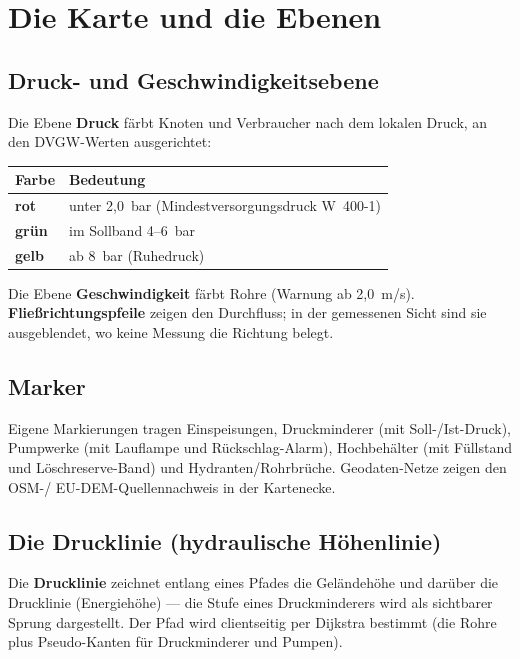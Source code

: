 \documentclass[11pt,a4paper,parskip=half]{scrreprt}
\newcommand{\ui}[1]{\textsf{\bfseries #1}}      %
\begin{document}
\chapter{Die Karte und die Ebenen}
\label{ch:karte}

\section{Druck- und Geschwindigkeitsebene}

Die Ebene \ui{Druck} färbt Knoten und Verbraucher nach dem lokalen Druck, an den
DVGW-Werten ausgerichtet:

\begin{center}
\begin{tabular}{@{}ll@{}}
\toprule
Farbe & Bedeutung \\
\midrule
\textcolor{rot}{\textbf{rot}}   & unter 2{,}0~bar (Mindestversorgungsdruck W~400-1) \\
\textcolor{gruen}{\textbf{grün}} & im Sollband 4--6~bar \\
\textcolor{amber}{\textbf{gelb}} & ab 8~bar (Ruhedruck) \\
\bottomrule
\end{tabular}
\end{center}

Die Ebene \ui{Geschwindigkeit} färbt Rohre (Warnung ab 2{,}0~m/s).
\textbf{Fließrichtungspfeile} zeigen den Durchfluss; in der gemessenen Sicht sind
sie ausgeblendet, wo keine Messung die Richtung belegt.

\section{Marker}
Eigene Markierungen tragen Einspeisungen, Druckminderer (mit Soll-/Ist-Druck),
Pumpwerke (mit Lauflampe und Rückschlag-Alarm), Hochbehälter (mit Füllstand und
Löschreserve-Band) und Hydranten/Rohrbrüche. Geodaten-Netze zeigen den OSM-/
EU-DEM-Quellennachweis in der Kartenecke.

\section{Die Drucklinie (hydraulische Höhenlinie)}

Die \ui{Drucklinie} zeichnet entlang eines Pfades die Geländehöhe und darüber die
Drucklinie (Energiehöhe) — die Stufe eines Druckminderers wird als sichtbarer
Sprung dargestellt. Der Pfad wird clientseitig per Dijkstra bestimmt (die Rohre
plus Pseudo-Kanten für Druckminderer und Pumpen).
\end{document}
